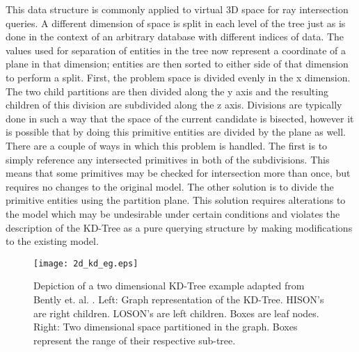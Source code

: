 This data structure is commonly applied to virtual 3D space for ray intersection
queries. A different dimension of space is split in each level of the tree just
as is done in the context of an arbitrary database with different indices of
data. The values used for separation of entities in the tree now represent a
coordinate of a plane in that dimension; entities are then sorted to either side
of that dimension to perform a split. First, the problem space is divided evenly
in the x dimension. The two child partitions are then divided along the y axis
and the resulting children of this division are subdivided along the z
axis. Divisions are typically done in such a way that the space of the current
candidate is bisected, however it is possible that by doing this primitive
entities are divided by the plane as well. There are a couple of ways in which
this problem is handled. The first is to simply reference any intersected
primitives in both of the subdivisions. This means that some primitives may be
checked for intersection more than once, but requires no changes to the original
model. The other solution is to divide the primitive entities using the
partition plane.  This solution requires alterations to the model which may be
undesirable under certain conditions and violates the description of the KD-Tree
as a pure querying structure by making modifications to the existing model.

\begin{figure}[H]
  \texttt{[image: 2d\_kd\_eg.eps]}
  \caption{Depiction of a two dimensional KD-Tree example adapted from Bently
    et. al. \cite{Bentley_1975}. Left: Graph representation of the
    KD-Tree. HISON's are right children. LOSON's are left children. Boxes are
    leaf nodes. Right: Two dimensional space partitioned in the graph. Boxes represent
    the range of their respective sub-tree.}
  \label{fig:2D_kd_tree}
\end{figure}


